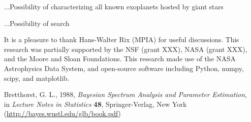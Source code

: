 \documentclass[12pt, preprint]{aastex}
\begin{document}
...Possibility of characterizing all known exoplanets hosted by giant stars

...Possibility of search

\acknowledgements
It is a pleasure to thank
  Hans-Walter Rix (MPIA)
for useful discussions.
This research was partially supported by the NSF (grant XXX), NASA
(grant XXX), and the Moore and Sloan Foundations.
This research made use of the NASA Astrophysics Data System, and
open-source software including Python, numpy, scipy, and matplotlib.

\begin{thebibliography}{}\raggedright
{}
  Bretthorst, G. L., 1988,
  \textit{Bayesian Spectrum Analysis and Parameter Estimation},
  in \textit{Lecture Notes in Statistics} \textbf{48},
  Springer-Verlag, New York
  \footnotesize{(\url{http://bayes.wustl.edu/glb/book.pdf})}
\end{thebibliography}
\end{document}
